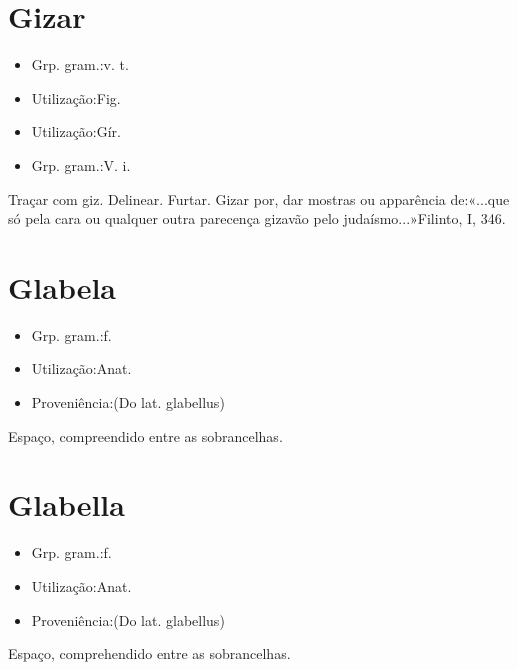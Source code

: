 \section{Gizar}
\begin{itemize}
\item {Grp. gram.:v. t.}
\end{itemize}
\begin{itemize}
\item {Utilização:Fig.}
\end{itemize}
\begin{itemize}
\item {Utilização:Gír.}
\end{itemize}
\begin{itemize}
\item {Grp. gram.:V. i.}
\end{itemize}
Traçar com giz.
Delinear.
Furtar.
\textunderscore Gizar por\textunderscore , dar mostras ou apparência de:«\textunderscore ...que só pela cara ou qualquer outra parecença gizavão pelo judaísmo...\textunderscore »Filinto, I, 346.
\section{Glabela}
\begin{itemize}
\item {Grp. gram.:f.}
\end{itemize}
\begin{itemize}
\item {Utilização:Anat.}
\end{itemize}
\begin{itemize}
\item {Proveniência:(Do lat. \textunderscore glabellus\textunderscore )}
\end{itemize}
Espaço, compreendido entre as sobrancelhas.
\section{Glabella}
\begin{itemize}
\item {Grp. gram.:f.}
\end{itemize}
\begin{itemize}
\item {Utilização:Anat.}
\end{itemize}
\begin{itemize}
\item {Proveniência:(Do lat. \textunderscore glabellus\textunderscore )}
\end{itemize}
Espaço, comprehendido entre as sobrancelhas.
